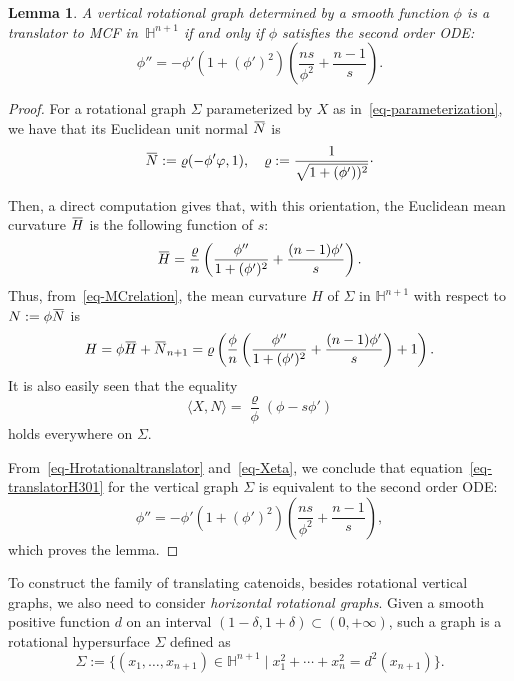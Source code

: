 \documentclass{amsart}[12pt]
\newtheorem{lemma}[theorem]{Lemma}
\theoremstyle{definition}
\theoremstyle{plain}
\newcommand{\h}{\mathbb{H} }
\renewcommand{\rho}{\varrho}
\renewcommand{\Sigma}{\varSigma}
\newcommand{\overbar}[1]{\mkern 1.5mu\overline{\mkern-1.5mu#1\mkern-1.5mu}\mkern 1.5mu}
\begin{document}
\begin{lemma} \label{lem-rotationalODE01}
A vertical rotational graph determined by a smooth function $\phi$ is
a translator to {\rm MCF} in \,$\h^{n+1}$
if and only if $\phi$ satisfies the second order {\rm ODE}:
\begin{equation} \label{eq-EDOPsi}
\phi''=-\phi'(1+(\phi')^2)\left(\frac{ns}{\phi^2}+\frac{n-1}s\right).
\end{equation}
\end{lemma}
\begin{proof}
For a rotational graph $\Sigma$ parameterized by
$X$ as in~\eqref{eq-parameterization}, we have that its
Euclidean unit normal $\overbar N$ is
\[
\overbar N:=\rho(-\phi'\varphi,1),
\quad \rho:=\frac{1}{\sqrt{1+(\phi'))^2}}\cdot
\]

Then, a direct computation gives that, with this orientation,
the Euclidean mean curvature $\overbar H$ is the following function of $s$:
\[
\overbar H=\frac{\rho}{n}\left(\frac{\phi''}{1+(\phi')^2}+\frac{(n-1)\phi'}{s}\right).
\]
Thus, from~\eqref{eq-MCrelation}, the mean curvature $H$ of $\Sigma$ in $\h^{n+1}$ with respect to $N:=\phi\overbar N$ is
\begin{equation} \label{eq-Hrotationaltranslator}
H=\phi\overbar H+\overbar N_{n+1}
=\rho\left(
\frac{\phi}{n}\left(\frac{\phi''}{1+(\phi')^2}+\frac{(n-1)\phi'}{s}\right)+1\right).
\end{equation}
It is also easily seen that the equality
\begin{equation} \label{eq-Xeta}
\langle X,N\rangle=\frac{\rho}{\phi}(\phi-s\phi')
\end{equation}
holds everywhere on $\Sigma.$


From~\eqref{eq-Hrotationaltranslator} and~\eqref{eq-Xeta}, we conclude that
equation~\eqref{eq-translatorH301} for the vertical graph
$\Sigma$ is equivalent to the second order ODE:
\begin{equation*}
\phi''=-\phi'(1+(\phi')^2)\left(\frac{ns}{\phi^2}+\frac{n-1}s\right),
\end{equation*}
which proves the lemma.
\end{proof}

To construct the family of translating catenoids, besides rotational vertical graphs,
we also need to consider \emph{horizontal rotational graphs}. Given a smooth positive function
$d$ on an interval $(1-\delta,1+\delta)\subset (0,+\infty)$, such a graph is a rotational hypersurface
$\Sigma$ defined as
\[
\Sigma:=\{(x_1,\dots,x_{n+1})\in\h^{n+1}\mid x_1^2+\cdots+x_{n}^2=d^2(x_{n+1})\}.
\]
\end{document}
